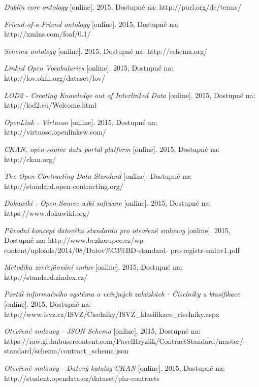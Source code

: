 \begin{thebibliography}{99}
  \emph{Dublin core ontology} 
  [online]. 2015, Dostupné na: 
  http://purl.org/dc/terms/
  
  \emph{Friend-of-a-Friend ontology} 
  [online]. 2015, Dostupné na: 
  http://xmlns.com/foaf/0.1/
  
  \emph{Schema ontology} 
  [online]. 2015, Dostupné na: 
  http://schema.org/
  
  \emph{Linked Open Vocabularies } 
  [online]. 2015, Dostupné na: 
  http://lov.okfn.org/dataset/lov/
  
  \emph{LOD2 - Creating Knowledge out of Interlinked Data} 
  [online]. 2015, Dostupné na: 
  http://lod2.eu/Welcome.html
  
  \emph{OpenLink - Virtuoso} 
  [online]. 2015, Dostupné na: 
  http://virtuoso.openlinksw.com/

  \emph{CKAN, open-source data portal platform} 
  [online]. 2015, Dostupné na: 
  http://ckan.org/

  \emph{The Open Contracting Data Standard} 
  [online]. Dostupné na: 
  http://standard.open-contracting.org/
  
  \emph{Dokuwiki - Open Source wiki software} 
  [online]. 2015, Dostupné na: 
  https://www.dokuwiki.org/
  
  \emph{Původní koncept datového standardu pro otevřené smlouvy} 
  [online]. 2015, Dostupné na: 
  http://www.bezkorupce.cz/wp-content/uploads/2014/08/Datov\%C3\%BD-standard- pro-registr-smluv1.pdf
  
  \emph{Metodika zveřejňování smluv} 
  [online]. 2015, Dostupné na: 
  http://standard.zindex.cz/

  \emph{Portál informačního systému o veřejných zakázkách - Číselníky a klasifikace} 
  [online]. 2015, Dostupné na: 
  http://www.isvz.cz/ISVZ/Ciselniky/ISVZ\_klasifikace\_ciselniky.aspx

  \emph{Otevřené smlouvy - JSON Schema} 
  [online]. 2015, Dostupné na: 
  https://raw.githubusercontent.com/PavelHryzlik/ContractStandard/master/- standard/schema/contract\_schema.json

  \emph{Otevřené smlouvy - Datový katalog CKAN} 
  [online]. 2015, Dostupné na: 
  http://student.opendata.cz/dataset/phr-contracts 
  



\end{thebibliography}
